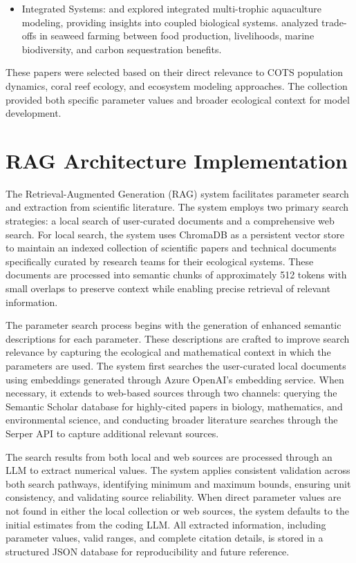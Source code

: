 \begin{itemize}
\item Integrated Systems: \cite{Hadley_Wild-Allen_Johnson_Macleod_2015} and \cite{Oca_Cremades_Jimenez_Pintado_Masalo_2019} explored integrated multi-trophic aquaculture modeling, providing insights into coupled biological systems. \cite{Spillias_Cottrell_2024} analyzed trade-offs in seaweed farming between food production, livelihoods, marine biodiversity, and carbon sequestration benefits.
\end{itemize}

These papers were selected based on their direct relevance to COTS population dynamics, coral reef ecology, and ecosystem modeling approaches. The collection provided both specific parameter values and broader ecological context for model development.

\section{RAG Architecture Implementation}
\label{subsec:rag_architecture}

The Retrieval-Augmented Generation (RAG) system facilitates parameter search and extraction from scientific literature. The system employs two primary search strategies: a local search of user-curated documents and a comprehensive web search. For local search, the system uses ChromaDB as a persistent vector store to maintain an indexed collection of scientific papers and technical documents specifically curated by research teams for their ecological systems. These documents are processed into semantic chunks of approximately 512 tokens with small overlaps to preserve context while enabling precise retrieval of relevant information.

The parameter search process begins with the generation of enhanced semantic descriptions for each parameter. These descriptions are crafted to improve search relevance by capturing the ecological and mathematical context in which the parameters are used. The system first searches the user-curated local documents using embeddings generated through Azure OpenAI's embedding service. When necessary, it extends to web-based sources through two channels: querying the Semantic Scholar database for highly-cited papers in biology, mathematics, and environmental science, and conducting broader literature searches through the Serper API to capture additional relevant sources.

The search results from both local and web sources are processed through an LLM to extract numerical values. The system applies consistent validation across both search pathways, identifying minimum and maximum bounds, ensuring unit consistency, and validating source reliability. When direct parameter values are not found in either the local collection or web sources, the system defaults to the initial estimates from the coding LLM. All extracted information, including parameter values, valid ranges, and complete citation details, is stored in a structured JSON database for reproducibility and future reference.

